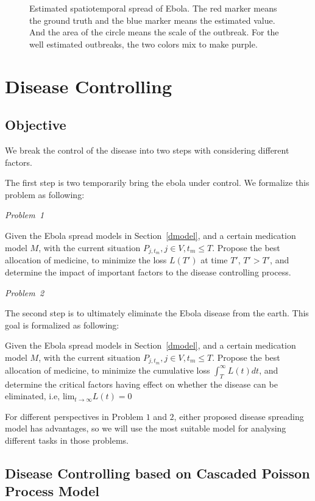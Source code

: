 \documentclass[12pt]{article}
\begin{document}
\begin{figure}
\begin{center}
  \caption{Estimated spatiotemporal spread of Ebola. The red marker means the ground truth and the blue marker means the estimated value. And the area of the circle means the scale of the outbreak. For the well estimated outbreaks, the two colors mix to make purple.}
  \label{espread}
\end{center}  
\end{figure}


\section{Disease Controlling}

\subsection{Objective}
We break the control of the disease into two steps with considering different factors. 

The first step is two temporarily bring the ebola under control. We formalize this problem as following:

\emph{Problem~1}

Given the Ebola spread models in Section~\ref{dmodel}, and a certain medication model $M$, with the current situation $P_{j,t_m}, j \in V, t_m \leq T$. Propose the best allocation of medicine, to minimize the loss $L(T')$ at time $T'$, $T' > T'$, and determine the impact of important factors to the disease controlling process.


\emph{Problem~2}

The second step is to ultimately eliminate the Ebola disease from the earth. This goal is formalized as following:

Given the Ebola spread models in Section~\ref{dmodel}, and a certain medication model $M$, with the current situation $P_{j,t_m}, j \in V, t_m \leq T$. Propose the best allocation of medicine, to minimize the cumulative loss $\int_{T}^{\infty} L(t) dt $, and determine the critical factors having effect on whether   the disease can be eliminated, i.e, $\text{lim}_{t\rightarrow \infty} L(t) = 0 $

For different perspectives in Problem $1$ and $2$, either proposed disease spreading model has advantages, so we will use the most suitable model for  analysing different tasks in those problems.


\subsection{Disease Controlling based on Cascaded Poisson Process Model}
\end{document}
